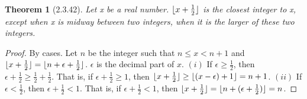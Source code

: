 \documentclass[a4paper, 12pt]{article}
\theoremstyle{plain}
\newtheorem*{theorem*}{Theorem}
\DeclarePairedDelimiter{\floor}{\lfloor}{\rfloor}
\begin{document}
	
	\begin{theorem*}[2.3.42]
		Let x be a real number. $\floor{x + \frac{1}{2}}$ is the closest integer to x, except when x is midway between two integers, when it is the larger of these two integers.
	\end{theorem*}
	
	\begin{proof}
		By cases. Let $n$ be the integer such that $n \le x < n+1$ and \newline $\floor{x + \frac{1}{2}} = \floor{n + \epsilon + \frac{1}{2}}$. $\epsilon$ is the decimal part of $x$. \newline \newline $(i)$ If $\epsilon \ge \frac{1}{2}$, then $\epsilon + \frac{1}{2} \ge \frac{1}{2} + \frac{1}{2}$. That is, if $\epsilon + \frac{1}{2} \ge 1$, then \newline  $\floor{x + \frac{1}{2}} \ge \floor {(x - \epsilon) + 1} = n + 1$.
		\newline \newline $(ii)$ If $\epsilon < \frac{1}{2}$, then $\epsilon + \frac{1}{2} < 1$. That is, if $\epsilon + \frac{1}{2} < 1$, then \newline $\floor{x + \frac{1}{2}} = \floor{n + (\epsilon + \frac{1}{2})} = n$.
	\end{proof}
\end{document}
